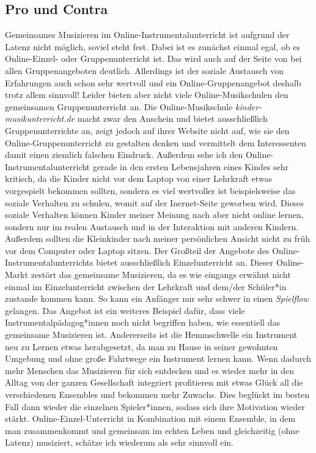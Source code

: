 \subsection{Pro und Contra}
Gemeinsames Musizieren im Online-Instrumentalunterricht ist aufgrund der Latenz
nicht möglich, soviel steht fest. Dabei ist es zunächst einmal egal, ob es
Online-Einzel- oder Gruppenunterricht ist. Das wird auch auf der Seite von
\autocite{online_musikschule_mmo} bei allen Gruppenangeboten deutlich.
Allerdings ist der soziale Austausch von Erfahrungen auch schon sehr wertvoll
und ein Online-Gruppenangebot deshalb trotz allem sinnvoll! Leider bieten aber
nicht viele Online-Musikschulen den gemeinsamen Gruppenunterricht an. Die
Online-Musikschule \emph{kinder-musikunterricht.de} macht zwar den Anschein und
bietet ausschließlich Gruppenunterrichte an, zeigt jedoch auf ihrer Website
nicht auf, wie sie den Online-Gruppenunterricht zu gestalten denken und
vermittelt dem Interessenten damit einen ziemlich falschen Eindruck. Außerdem
sehe ich den Online-Instrumentalunterricht gerade in den ersten Lebensjahren
eines Kindes sehr kritisch, da die Kinder nicht vor dem Laptop von einer
Lehrkraft etwas vorgespielt bekommen sollten, sondern es viel wertvoller ist
beispielsweise das soziale Verhalten zu schulen, womit auf der Inernet-Seite
geworben wird. Dieses soziale Verhalten können Kinder meiner Meinung nach aber
nicht online lernen, sondern nur im realen Austausch und in der Interaktion mit
anderen Kindern. Außerdem sollten die Kleinkinder nach meiner persönlichen
Ansicht nicht zu früh vor dem Computer oder Laptop sitzen. Der Großteil der
Angebote des Online-Instrumentalunterrichts bietet ausschließlich
Einzelunterricht an. Dieser Online-Markt zestört das gemeinsame Musizieren, da
es wie eingangs erwähnt nicht einmal im Einzelunterricht zwischen der Lehrkraft
und dem/der Schüler*in zustande kommen kann. So kann ein Anfänger nur sehr
schwer in einen \emph{Spielflow} gelangen. Das Angebot ist ein weiteres Beispiel
dafür, dass viele Instrumentalpädagog*innen noch nicht begriffen haben, wie
essentiell das gemeinsame Musizieren ist. Andererseits ist die Hemmschwelle ein
Instrument neu zu Lernen etwas herabgesetzt, da man zu Hause in seiner gewohnten
Umgebung und ohne große Fahrtwege ein Instrument lernen kann. Wenn dadurch mehr
Menschen das Musizieren für sich entdecken und es wieder mehr in den Alltag von
der ganzen Gesellschaft integriert profitieren mit etwas Glück all die
verschiedenen Ensembles und bekommen mehr Zuwachs. Dies beglückt im besten Fall
dann wieder die einzelnen Spieler*innen, sodass sich ihre Motivation wieder
stärkt. Online-Einzel-Unterricht in Kombination mit einem Ensemble, in dem man
zusammenkommt und gemeinsam im echten Leben und gleichzeitig (ohne Latenz)
musiziert, schätze ich wiederum als sehr sinnvoll ein. 

